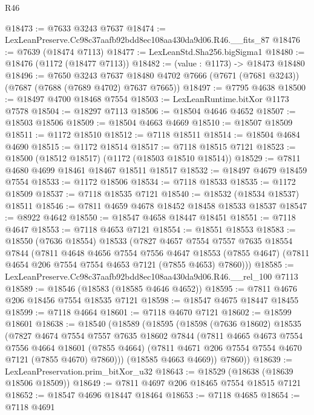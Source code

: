\begin{lexlean}{R46}
\begin{coremodule}
@18473 := @7633 @3243 @7637
@18474 := LexLeanPreserve.Cc98c37aafb92bdd8ec108aa430da9d06.R46.__fits_87
@18476 := @7639 (@18474 @7113)
@18477 := LexLeanStd.Sha256.bigSigma1
@18480 := @18476 (@1172 (@18477 @7113))
@18482 := (value : @1173) -> @18473 @18480
@18496 := @7650
    @3243
    @7637
    @18480
    @4702
    @7666
    (@7671 (@7681 @3243))
    (@7687 (@7688 (@7689 @4702) @7637 @7665))
@18497 := @7795 @4638
@18500 := @18497 @4700 @18468 @7554
@18503 := LexLeanRuntime.bitXor @1173 @7578
@18504 := @18297 @7113
@18506 := @18504 @4646 @4652
@18507 := @18503 @18506
@18509 := @18504 @4663 @4669
@18510 := @18507 @18509
@18511 := @1172 @18510
@18512 := @7118 @18511
@18514 := @18504 @4684 @4690
@18515 := @1172 @18514
@18517 := @7118 @18515 @7121
@18523 := @18500 (@18512 @18517) (@1172 (@18503 @18510 @18514))
@18529 := @7811 @4680 @4699 @18461 @18467 @18511 @18517
@18532 := @18497 @4679 @18459 @7554
@18533 := @1172 @18506
@18534 := @7118 @18533
@18535 := @1172 @18509
@18537 := @7118 @18535 @7121
@18540 := @18532 (@18534 @18537) @18511
@18546 := @7811 @4659 @4678 @18452 @18458 @18533 @18537
@18547 := @8922 @4642
@18550 := @18547 @4658 @18447 @18451
@18551 := @7118 @4647
@18553 := @7118 @4653 @7121
@18554 := @18551 @18553
@18583 := @18550
    (@7636 @18554)
    @18533
    (@7827
      @4657
      @7554
      @7557
      @7635
      @18554
      @7844
      (@7811
        @4648
        @4656
        @7554
        @7556
        @4647
        @18553
        (@7855 @4647)
        (@7811 @4654 @206 @7554 @7554 @4653 @7121 (@7855 @4653) @7860)))
@18585 := LexLeanPreserve.Cc98c37aafb92bdd8ec108aa430da9d06.R46.__rel_100 @7113
@18589 := @18546 (@18583 (@18585 @4646 @4652))
@18595 := @7811 @4676 @206 @18456 @7554 @18535 @7121
@18598 := @18547 @4675 @18447 @18455
@18599 := @7118 @4664
@18601 := @7118 @4670 @7121
@18602 := @18599 @18601
@18638 := @18540
    (@18589
      (@18595
        (@18598
          (@7636 @18602)
          @18535
          (@7827
            @4674
            @7554
            @7557
            @7635
            @18602
            @7844
            (@7811
              @4665
              @4673
              @7554
              @7556
              @4664
              @18601
              (@7855 @4664)
              (@7811 @4671 @206 @7554 @7554 @4670 @7121 (@7855 @4670) @7860)))
          (@18585 @4663 @4669))
        @7860))
@18639 := LexLeanPreservation.prim_bitXor_u32
@18643 := @18529 (@18638 (@18639 @18506 @18509))
@18649 := @7811 @4697 @206 @18465 @7554 @18515 @7121
@18652 := @18547 @4696 @18447 @18464
@18653 := @7118 @4685
@18654 := @7118 @4691

\end{coremodule}
\end{lexlean}
